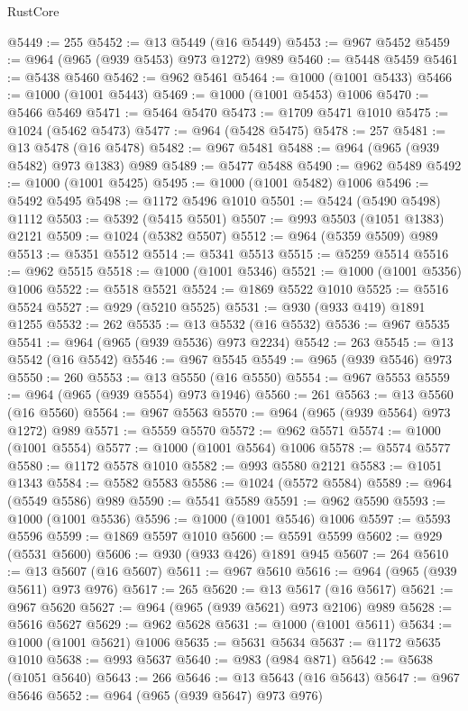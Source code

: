 \begin{lexlean}{RustCore}
\begin{coremodule}
@5449 := 255
@5452 := @13 @5449 (@16 @5449)
@5453 := @967 @5452
@5459 := @964 (@965 (@939 @5453) @973 @1272) @989
@5460 := @5448 @5459
@5461 := @5438 @5460
@5462 := @962 @5461
@5464 := @1000 (@1001 @5433)
@5466 := @1000 (@1001 @5443)
@5469 := @1000 (@1001 @5453) @1006
@5470 := @5466 @5469
@5471 := @5464 @5470
@5473 := @1709 @5471 @1010
@5475 := @1024 (@5462 @5473)
@5477 := @964 (@5428 @5475)
@5478 := 257
@5481 := @13 @5478 (@16 @5478)
@5482 := @967 @5481
@5488 := @964 (@965 (@939 @5482) @973 @1383) @989
@5489 := @5477 @5488
@5490 := @962 @5489
@5492 := @1000 (@1001 @5425)
@5495 := @1000 (@1001 @5482) @1006
@5496 := @5492 @5495
@5498 := @1172 @5496 @1010
@5501 := @5424 (@5490 @5498) @1112
@5503 := @5392 (@5415 @5501)
@5507 := @993 @5503 (@1051 @1383) @2121
@5509 := @1024 (@5382 @5507)
@5512 := @964 (@5359 @5509) @989
@5513 := @5351 @5512
@5514 := @5341 @5513
@5515 := @5259 @5514
@5516 := @962 @5515
@5518 := @1000 (@1001 @5346)
@5521 := @1000 (@1001 @5356) @1006
@5522 := @5518 @5521
@5524 := @1869 @5522 @1010
@5525 := @5516 @5524
@5527 := @929 (@5210 @5525)
@5531 := @930 (@933 @419) @1891 @1255
@5532 := 262
@5535 := @13 @5532 (@16 @5532)
@5536 := @967 @5535
@5541 := @964 (@965 (@939 @5536) @973 @2234)
@5542 := 263
@5545 := @13 @5542 (@16 @5542)
@5546 := @967 @5545
@5549 := @965 (@939 @5546) @973
@5550 := 260
@5553 := @13 @5550 (@16 @5550)
@5554 := @967 @5553
@5559 := @964 (@965 (@939 @5554) @973 @1946)
@5560 := 261
@5563 := @13 @5560 (@16 @5560)
@5564 := @967 @5563
@5570 := @964 (@965 (@939 @5564) @973 @1272) @989
@5571 := @5559 @5570
@5572 := @962 @5571
@5574 := @1000 (@1001 @5554)
@5577 := @1000 (@1001 @5564) @1006
@5578 := @5574 @5577
@5580 := @1172 @5578 @1010
@5582 := @993 @5580 @2121
@5583 := @1051 @1343
@5584 := @5582 @5583
@5586 := @1024 (@5572 @5584)
@5589 := @964 (@5549 @5586) @989
@5590 := @5541 @5589
@5591 := @962 @5590
@5593 := @1000 (@1001 @5536)
@5596 := @1000 (@1001 @5546) @1006
@5597 := @5593 @5596
@5599 := @1869 @5597 @1010
@5600 := @5591 @5599
@5602 := @929 (@5531 @5600)
@5606 := @930 (@933 @426) @1891 @945
@5607 := 264
@5610 := @13 @5607 (@16 @5607)
@5611 := @967 @5610
@5616 := @964 (@965 (@939 @5611) @973 @976)
@5617 := 265
@5620 := @13 @5617 (@16 @5617)
@5621 := @967 @5620
@5627 := @964 (@965 (@939 @5621) @973 @2106) @989
@5628 := @5616 @5627
@5629 := @962 @5628
@5631 := @1000 (@1001 @5611)
@5634 := @1000 (@1001 @5621) @1006
@5635 := @5631 @5634
@5637 := @1172 @5635 @1010
@5638 := @993 @5637
@5640 := @983 (@984 @871)
@5642 := @5638 (@1051 @5640)
@5643 := 266
@5646 := @13 @5643 (@16 @5643)
@5647 := @967 @5646
@5652 := @964 (@965 (@939 @5647) @973 @976)

\end{coremodule}
\end{lexlean}
